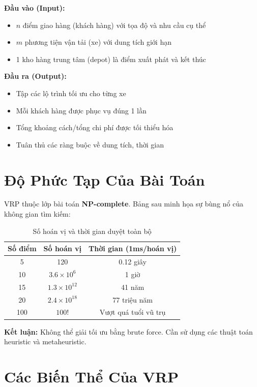 \documentclass[12pt,a4paper,openany,oneside]{report}
\begin{document}
\textbf{Đầu vào (Input):}
\begin{itemize}
    \item $n$ điểm giao hàng (khách hàng) với tọa độ và nhu cầu cụ thể
    \item $m$ phương tiện vận tải (xe) với dung tích giới hạn
    \item 1 kho hàng trung tâm (depot) là điểm xuất phát và kết thúc
\end{itemize}

\textbf{Đầu ra (Output):}
\begin{itemize}
    \item Tập các lộ trình tối ưu cho từng xe
    \item Mỗi khách hàng được phục vụ đúng 1 lần
    \item Tổng khoảng cách/tổng chi phí được tối thiểu hóa
    \item Tuân thủ các ràng buộc về dung tích, thời gian
\end{itemize}

\section{Độ Phức Tạp Của Bài Toán}

VRP thuộc lớp bài toán \textbf{NP-complete}. Bảng sau minh họa sự bùng nổ của không gian tìm kiếm:

\begin{table}[h]
\centering
\caption{Số hoán vị và thời gian duyệt toàn bộ}
\begin{tabular}{@{}ccc@{}}
\toprule
\textbf{Số điểm} & \textbf{Số hoán vị} & \textbf{Thời gian (1ms/hoán vị)} \\
\midrule
5 & 120 & 0.12 giây \\
10 & $3.6 \times 10^6$ & 1 giờ \\
15 & $1.3 \times 10^{12}$ & 41 năm \\
20 & $2.4 \times 10^{18}$ & 77 triệu năm \\
100 & $100!$ & Vượt quá tuổi vũ trụ \\
\bottomrule
\end{tabular}
\end{table}

\textbf{Kết luận:} Không thể giải tối ưu bằng brute force. Cần sử dụng các thuật toán heuristic và metaheuristic.

\section{Các Biến Thể Của VRP}
\end{document}
